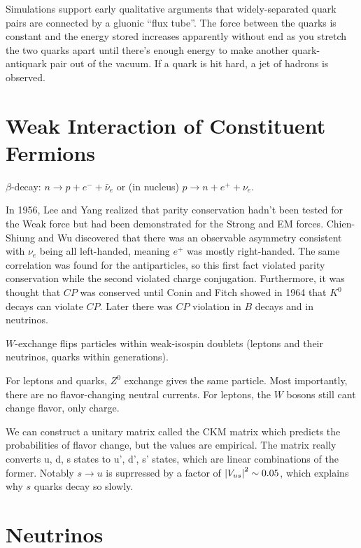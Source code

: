 \documentclass[a4paper,twoside,master.tex]{subfiles}
\begin{document}

Simulations support early qualitative arguments that widely-separated quark pairs are connected by a gluonic ``flux tube''. The force between the quarks is constant and the energy stored increases apparently without end as you stretch the two quarks apart until there's enough energy to make another quark-antiquark pair out of the vacuum. If a quark is hit hard, a jet of hadrons is observed.

\section{Weak Interaction of Constituent Fermions}
\label{sec:weak_interaction_of_constituent_fermions}

$ \beta $-decay: $ n \to p + e^- + \bar{\nu}_e $ or (in nucleus) $ p \to n + e^+ + \nu_e $.

In 1956, Lee and Yang realized that parity conservation hadn't been tested for the Weak force but had been demonstrated for the Strong and EM forces. Chien-Shiung and Wu discovered that there was an observable asymmetry consistent with $ \nu_e $ being all left-handed, meaning $ e^+ $ was mostly right-handed. The same correlation was found for the antiparticles, so this first fact violated parity conservation while the second violated charge conjugation. Furthermore, it was thought that $ CP $ was conserved until Conin and Fitch showed in 1964 that $ K^0 $ decays can violate $ CP $. Later there was $ CP $ violation in $ B $ decays and in neutrinos.

$ W $-exchange flips particles within weak-isospin doublets (leptons and their neutrinos, quarks within generations).

For leptons and quarks, $ Z^0 $ exchange gives the same particle. Most importantly, there are no flavor-changing neutral currents. For leptons, the $ W $ bosons still cant change flavor, only charge.

We can construct a unitary matrix called the CKM matrix which predicts the probabilities of flavor change, but the values are empirical. The matrix really converts u, d, s states to u', d', s' states, which are linear combinations of the former. Notably $ s \to u $ is suprressed by a factor of $ \abs{V_{us}}^2 \sim 0.05 $, which explains why $ s $ quarks decay so slowly.

\section{Neutrinos}
\label{sec:neutrinos}
\end{document}
